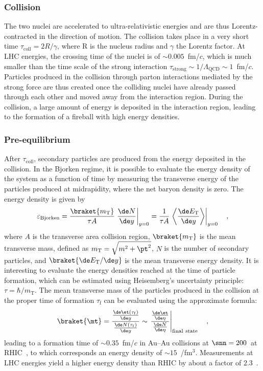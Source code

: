 \subsubsection{Collision}
The two nuclei are accelerated to ultra-relativistic energies and are thus Lorentz-contracted in the direction of motion. The collision takes place in a very short time $\tau_\mathrm{coll} = 2R/\gamma$, where R is the nucleus radius and $\gamma$ the Lorentz factor. At LHC energies, the crossing time of the nuclei is of $\sim 0.005$~fm/$c$, which is much smaller than the time scale of the strong interaction $\tau_\mathrm{strong} \sim 1/\Lambda_\mathrm{QCD} \sim 1$~fm/$c$. Particles produced in the collision through parton interactions mediated by the strong force are thus created once the colliding nuclei have already passed through each other and moved away from the interaction region. During the collision, a large amount of energy is deposited in the interaction region, leading to the formation of a fireball with high energy densities.

\subsubsection{Pre-equilibrium}
After $\tau_\mathrm{coll}$, secondary particles are produced from the energy deposited in the collision. In the Bjorken regime, it is possible to evaluate the energy density of the system as a function of time by measuring the transverse energy of the particles produced at midrapidity, where the net baryon density is zero. The energy density is given by
\begin{equation*}
    \varepsilon_\mathrm{Bjorken} = \frac{\braket{m_\mathrm{T}}}{\tau A} \left. \frac{\de N}{\de y}\right\rvert_{y=0} = \frac{1}{\tau A}\left. \left\langle\frac{\de E_\mathrm{T}}{\de y}\right\rangle\right\rvert_{y=0} \quad ,
\end{equation*}
where $A$ is the transverse area collision region, $\braket{m_\mathrm{T}}$ is the mean transverse mass, defined as $m_\mathrm{T} = \sqrt{m^2 + \pt^2}$, $N$ is the number of secondary particles, and $\braket{\de E_\mathrm{T}/\de y}$ is the mean transverse energy density. It is interesting to evaluate the energy densities reached at the time of particle formation, which can be estimated using Heisemberg's uncertainty principle: $\tau = \hbar/m_\mathrm{T}$. The mean transverse mass of the particles produced in the collision at the proper time of formation $\tau_\mathrm{f}$ can be evaluated using the approximate formula:
\begin{equation*}
    \braket{\mt} = \frac{\frac{\de \et(\tau_\mathrm{f})}{\de y}}{\frac{\de N(\tau_\mathrm{f})}{\de y}}\sim \left. \frac{\frac{\de \et}{\de \eta}}{\frac{\de N}{\de \eta}}\right\rvert_\mathrm{final~state}\quad ,
\end{equation*}
leading to a formation time of $\sim 0.35$~fm/$c$ in Au--Au collisions at $\snn=200$~\gevc at RHIC~\cite{PHENIX:2004vcz}, to which corresponds an energy density of $\sim 15$~\gev/fm$^3$. Measurements at LHC energies yield a higher energy density than RHIC by about a factor of 2.3~\cite{ALICE:2016igk}.

